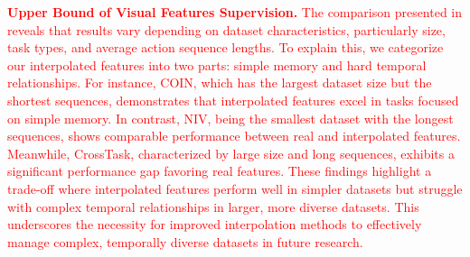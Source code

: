 
\textcolor{red}{
\textbf{Upper Bound of Visual Features Supervision.} The comparison presented in  reveals that results vary depending on dataset characteristics, particularly size, task types, and average action sequence lengths. To explain this, we categorize our interpolated features into two parts: simple memory and hard temporal relationships. For instance, COIN, which has the largest dataset size but the shortest sequences, demonstrates that interpolated features excel in tasks focused on simple memory. In contrast, NIV, being the smallest dataset with the longest sequences, shows comparable performance between real and interpolated features. Meanwhile, CrossTask, characterized by large size and long sequences, exhibits a significant performance gap favoring real features. These findings highlight a trade-off where interpolated features perform well in simpler datasets but struggle with complex temporal relationships in larger, more diverse datasets. This underscores the necessity for improved interpolation methods to effectively manage complex, temporally diverse datasets in future research.
}

